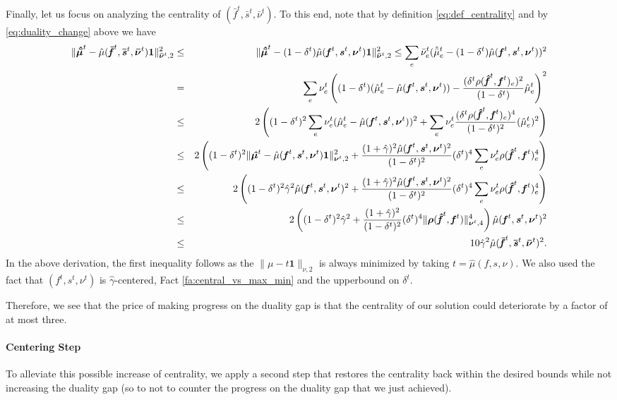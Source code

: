 \documentclass[11pt, letterpaper]{article}
\newcommand{\onev}{\mathbf{1}}
\newcommand{\norm}[2]{\|#1\|_{#2}}
\newcommand{\onu}{\bar{\nu}}
\newcommand{\hmu}{\hat{\mu}}
\newcommand{\ohmu}{\hat{\bar{\mu}}}
\newcommand{\hgamma}{\hat{\gamma}}
\newcommand{\vrho}{\boldsymbol{\mathit{\rho}}}
\newcommand{\vmu}{\boldsymbol{\mathit{\mu}}}
\newcommand{\vnu}{\boldsymbol{\mathit{\nu}}}
\newcommand{\ovnu}{\boldsymbol{\bar{\mathit{\nu}}}}
\newcommand{\hvmu}{\boldsymbol{\mathit{\hat{\mu}}}}
\newcommand{\ohvmu}{\boldsymbol{\mathit{\hat{\bar{\mu}}}}}
\newcommand{\ff}{\boldsymbol{\mathit{f}}}
\newcommand{\off}{\boldsymbol{\mathit{\bar{f}}}}
\newcommand{\hff}{\boldsymbol{\mathit{\hat{f}}}}
\renewcommand{\ss}{\boldsymbol{\mathit{s}}}
\newcommand{\oss}{\boldsymbol{\bar{\mathit{s}}}}
\begin{document}
Finally, let us focus on analyzing the centrality of $(\off^t,\oss^t,\ovnu^t)$. To this end,  note that by definition \eqref{eq:def_centrality} and by \eqref{eq:duality_change} above we have
\begin{eqnarray}
\norm{\ohvmu^t-\hmu(\off^t,\oss^t,\ovnu^t)\onev}{\ovnu^t,2}^2 & \leq & \norm{\ohvmu^t-(1-\delta^t)\hmu(\ff^t,\ss^t,\vnu^t)\onev}{\ovnu^t,2}^2 \leq \sum_e \onu_e^t (\ohmu_e^t-(1-\delta^t)\hmu(\ff^t,\ss^t,\vnu^t))^2\notag\\
&=& \sum_e \nu_e^t \left( (1-\delta^t)(\hmu_e^t-\hmu(\ff^t,\ss^t,\vnu^t))-\frac{(\delta^t\rho(\hff^t,\ff^t)_e)^2}{(1-\delta^t)}\hmu^t_e\right)^2\notag\\
&\leq & 2 \left((1-\delta^t)^2\sum_e \nu_e^t (\hmu^t_e-\hmu(\ff^t,\ss^t,\vnu^t))^2 + \sum_e \nu_e^t \frac{(\delta^t\rho(\hff^t,\ff^t)_e)^4}{(1-\delta^t)^2}(\hmu_e^t)^2 \right)\label{eq:centrality_increase}\\
&\leq & 2 \left((1-\delta^t)^2\norm{\hvmu^t-\hmu(\ff^t,\ss^t,\vnu^t)\onev}{\vnu^t,2}^2 + \frac{(1+\hgamma)^2\hmu(\ff^t,\ss^t,\vnu^t)^2}{(1-\delta^t)^2} (\delta^t)^4  \sum_e \nu_e^t \rho(\hff^t,\ff^t)_e^4 \right)\notag\\
&\leq & 2 \left((1-\delta^t)^2 \hgamma^2 \hmu(\ff^t,\ss^t,\vnu^t)^2 + \frac{(1+\hgamma)^2\hmu(\ff^t,\ss^t,\vnu^t)^2}{(1-\delta^t)^2} (\delta^t)^4 \sum_e \nu_e^t \rho(\hff^t,\ff^t)_e^4 \right)\notag\\
&\leq & 2 \left((1-\delta^t)^2 \hgamma^2 + \frac{(1+\hgamma)^2}{(1-\delta^t)^2} (\delta^t)^4 \norm{\vrho(\hff^t,\ff^t)}{\vnu^t,4}^4 \right)\hmu(\ff^t,\ss^t,\vnu^t)^2\notag\\
&\leq& 10 \hgamma^2\hmu(\off^t,\oss^t,\ovnu^t)^2. \notag
\end{eqnarray}
In the above derivation, the first inequality follows as the $\norm{\vmu-t\onev}{\vnu,2}$ is always minimized by taking $t=\hmu(\ff,\ss,\vnu)$. We also used the fact that $(\ff^t,\ss^t,\vnu^t)$ is $\hgamma$-centered, Fact \ref{fa:central_vs_max_min} and the upperbound on $\delta^t$.

Therefore, we see that the price of making progress on the duality gap is that the centrality of our solution could deteriorate by a factor of at most three. 

\paragraph{Centering Step}

To alleviate this possible increase of centrality, we apply a second step that restores the centrality back within the desired bounds while not increasing the duality gap (so to not to counter the progress on the duality gap that we just achieved).
\end{document}
